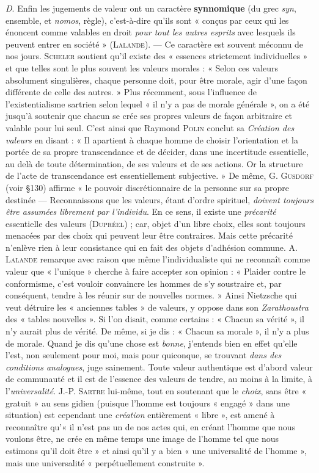 {\it D}. Enfin les jugements de valeur ont un caractère {\bf synnomique}
(du grec {\it syn}, ensemble, et {\it nomos}, règle), c’est-à-dire
qu'ils sont « conçus par ceux qui les énoncent comme valables en droit
{\it pour tout les autres esprits}
avec lesquels ils peuvent entrer en société » (\textsc{Lalande}).
— Ce caractère est souvent méconnu de nos jours. \textsc{Scheler} soutient
qu’il existe des « essences strictement individuelles » et que telles
sont le plus souvent les valeurs morales : « Selon ces valeurs
absolument singulières, chaque personne doit, pour être morale, agir d'une
façon différente de celle des autres. » Plus récemment, sous l’influence
de l’existentialisme sartrien selon lequel « il n’y a pas de morale
générale », on a été jusqu’à soutenir que chacun se crée ses propres
valeurs de façon arbitraire et valable pour lui seul. C'est ainsi que
Raymond \textsc{Polin} conclut sa {\it Création des valeurs} en disant : « Il
apartient à chaque homme de choisir l'orientation et la portée de sa
propre transcendance et de décider, dans une incertitude essentielle,
au delà de toute détermination, de ses valeurs et de ses actions. Or la
structure de l’acte de transcendance est essentiellement subjective. »
De même, G. \textsc{Gusdorf} (voir \S 130) affirme « le pouvoir discrétionnaire
de la personne sur sa propre destinée — Reconnaissons que les
valeurs, étant d’ordre spirituel, {\it doivent toujours être assumées librement
par l'individu}. En ce sens, il existe une {\it précarité} essentielle des
valeurs (\textsc{Dupréel}) ; car, objet d’un libre choix, elles sont toujours
menacées par des choix qui peuvent leur être contraires. Mais cette
précarité n’enlève rien à leur consistance qui en fait des objets d'adhésion
commune. A. \textsc{Lalande} remarque avec raison que même l’individualiste
qui ne reconnaît comme valeur que « l’unique » cherche
à faire accepter son opinion : « Plaider contre le conformisme, c’est
vouloir convaincre les hommes de s’y soustraire et, par conséquent,
tendre à les réunir sur de nouvelles normes. » Ainsi Nietzsche qui
veut détruire les « anciennes tables » de valeurs, y oppose dans son
{\it Zarathoustra} des « tables nouvelles ». Si l'on disait, comme certains :
« Chacun sa vérité », il n’y aurait plus de vérité. De même, si je dis :
« Chacun sa morale », il n’y a plus de morale. Quand je dis qu’une
chose est {\it bonne}, j'entends bien en effet qu’elle l’est, non seulement
pour moi, mais pour quiconque, se trouvant {\it dans des conditions analogues},
juge sainement. Toute valeur authentique est d’abord valeur
de communauté et il est de l’essence des valeurs de tendre, au moins
à la limite, à l’{\it universalité}. J.-P. \textsc{Sartre} lui-même, tout en soutenant
que le {\it choix}, sans être « gratuit » au sens gidien (puisque l’homme est
toujours « engagé » dans une situation) est cependant une {\it création}
entièrement « libre », est amené à reconnaître qu’« il n’est pas un de
nos actes qui, en créant l’homme que nous voulons être, ne crée en
même temps une image de l’homme tel que nous estimons qu’il doit
être » et ainsi qu’il y a bien « une universalité de l’homme », mais une
universalité « perpétuellement construite ».

